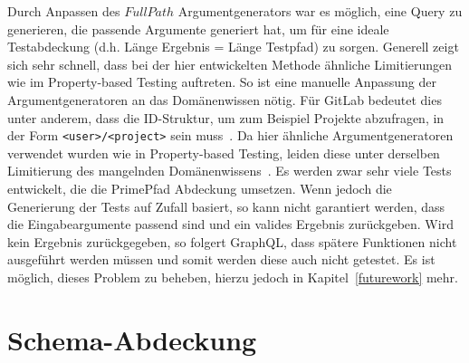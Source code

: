 Durch Anpassen des $FullPath$ Argumentgenerators war es möglich, eine Query zu generieren, die passende Argumente generiert hat, um für eine ideale Testabdeckung (d.h. Länge Ergebnis = Länge Testpfad) zu sorgen.
Generell zeigt sich sehr schnell, dass bei der hier entwickelten Methode ähnliche Limitierungen wie im Property-based Testing auftreten.
So ist eine manuelle Anpassung der Argumentgeneratoren an das Domänenwissen nötig.
Für GitLab bedeutet dies unter anderem, dass die ID-Struktur, um zum Beispiel Projekte abzufragen, in der Form \verb+<user>/<project>+ sein muss~\cite[vgl. S.8]{property-based-testing}.
Da hier ähnliche Argumentgeneratoren verwendet wurden wie in Property-based Testing, leiden diese unter derselben Limitierung des mangelnden Domänenwissens~\cite[vgl. S.8]{property-based-testing}.
Es werden zwar sehr viele Tests entwickelt, die die PrimePfad Abdeckung umsetzen.
Wenn jedoch die Generierung der Tests auf Zufall basiert, so kann nicht garantiert werden, dass die Eingabeargumente passend sind und ein valides Ergebnis zurückgeben.
Wird kein Ergebnis zurückgegeben, so folgert GraphQL, dass spätere Funktionen nicht ausgeführt werden müssen und somit werden diese auch nicht getestet.
Es ist möglich, dieses Problem zu beheben, hierzu jedoch in Kapitel~\ref{futurework} mehr.

\section{Schema-Abdeckung}

